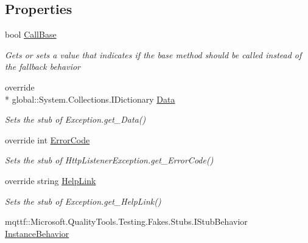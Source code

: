 \subsection*{Properties}
\begin{DoxyCompactItemize}
\item 
bool \hyperlink{class_system_1_1_net_1_1_fakes_1_1_stub_http_listener_exception_a32c2ecc12f76e59f7b7badd4a813a103}{Call\-Base}
\begin{DoxyCompactList}\small\item\em Gets or sets a value that indicates if the base method should be called instead of the fallback behavior\end{DoxyCompactList}\item 
override \\*
global\-::\-System.\-Collections.\-I\-Dictionary \hyperlink{class_system_1_1_net_1_1_fakes_1_1_stub_http_listener_exception_ae1f6e99b2d6613c2ae3c4ad4601c10a6}{Data}
\begin{DoxyCompactList}\small\item\em Sets the stub of Exception.\-get\-\_\-\-Data()\end{DoxyCompactList}\item 
override int \hyperlink{class_system_1_1_net_1_1_fakes_1_1_stub_http_listener_exception_a3ddfe606d6418f11687384e01a33c622}{Error\-Code}
\begin{DoxyCompactList}\small\item\em Sets the stub of Http\-Listener\-Exception.\-get\-\_\-\-Error\-Code()\end{DoxyCompactList}\item 
override string \hyperlink{class_system_1_1_net_1_1_fakes_1_1_stub_http_listener_exception_a3f92628202a10a0cd87281d7659c3b66}{Help\-Link}
\begin{DoxyCompactList}\small\item\em Sets the stub of Exception.\-get\-\_\-\-Help\-Link()\end{DoxyCompactList}\item 
mqttf\-::\-Microsoft.\-Quality\-Tools.\-Testing.\-Fakes.\-Stubs.\-I\-Stub\-Behavior \hyperlink{class_system_1_1_net_1_1_fakes_1_1_stub_http_listener_exception_a8debaabbd835b28d70acb154441d6f49}{Instance\-Behavior}

\end{DoxyCompactItemize}
